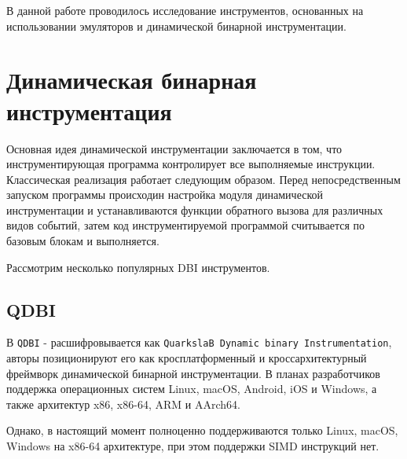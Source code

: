 В данной работе проводилось исследование инструментов, основанных на использовании эмуляторов и динамической бинарной инструментации.


\section{Динамическая бинарная инструментация}

Основная идея динамической инструментации заключается в том, что инструментирующая программа контролирует все выполняемые инструкции. Классическая реализация работает следующим образом. Перед непосредственным запуском программы происходин настройка модуля динамической инструментации и устанавливаются функции обратного вызова для различных видов событий, затем код инструментируемой программой считывается по базовым блокам и выполняется.

Рассмотрим несколько популярных DBI инструментов.

\subsection{QDBI}

В \cite{QDBI} \texttt{QDBI} - расшифровывается как \texttt{QuarkslaB Dynamic binary Instrumentation}, авторы позиционируют его как кросплатформенный и кроссархитектурный фреймворк динамической бинарной инструментации. В планах разработчиков поддержка операционных систем Linux, macOS, Android, iOS и Windows, а также архитектур  x86, x86-64, ARM и AArch64.

Однако, в настоящий момент полноценно поддерживаются только Linux, macOS, Windows на x86-64 архитектуре, при этом поддержки SIMD инструкций нет.


